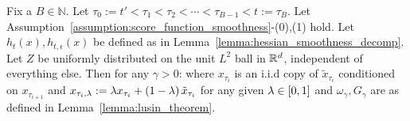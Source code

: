 \begin{lemma}\label{lemma:lusin_theorem_decomp} 
Fix a $B \in \mathbb{N}$. Let $\tau_{0} := t' < \tau_{1} < \tau_{2} < \cdots < \tau_{B-1} < t := \tau_{B}$. Let Assumption~\ref{assumption:score_function_smoothness}-(0),(1) hold. Let $h_t(x),h_{t, \epsilon}(x)$ be defined as in Lemma~\ref{lemma:hessian_smoothness_decomp}.  Let $Z$ be uniformly distributed on the unit $L^2$ ball in $\mathbb{R}^d$, independent of everything else. Then for any $\gamma > 0$:
where $x_{\tau_i}$ is an i.i.d copy of $\tilde{x}_{\tau_i}$ conditioned on $x_{\tau_{i+1}}$ and $x_{\tau_i,\lambda} := \lambda x_{\tau_i} + \left(1-\lambda\right)\tilde{x}_{\tau_i}$ for any given $\lambda \in \left[0,1\right]$ and $\omega_{\gamma}, G_{\gamma}$ are as defined in Lemma~\ref{lemma:lusin_theorem}.
\end{lemma}
